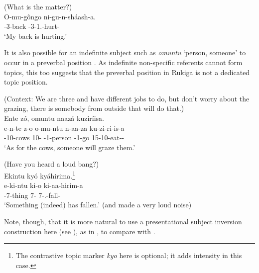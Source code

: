 \documentclass[output=paper]{langscibook}
\begin{document}
\ea
\label{bkm:Ref116291368}
(What is the matter?)\\
\gll
O-mu-gôngo  ni-gu-n-sháash-a.\\
\AUG{}-3-back  \IPFV{}-3\SM{}-1\SG{}.\OM{}-hurt-\FV{} \\
\glt
`My back is hurting.’\\


\z

It is also possible for an indefinite subject such as \textit{omuntu} ‘person, someone’ to occur in a preverbal position . As indefinite non-specific referents cannot form topics, this too suggests that the preverbal position in Rukiga is not a dedicated topic position.

\ea
\label{bkm:Ref113432268}
(Context: We are three and have different jobs to do, but don’t worry about the grazing, there   is somebody from outside that will do that.)\\
Ente zó, omuntu naazá kuziríisa.\\
\gll
e-n-te  z-o  o-mu-ntu  n-aa-za  ku-zi-ri-is-a\\
\AUG{}-10-cows  10-\CM{}  \AUG{}-{}1-person  \IPFV{}-1\SM{}-go  15-10\OM{}-eat-\CAUS{}-\FV{}\\
\glt
`As for the cows, someone will graze them.’\\


\z

\ea
\label{bkm:Ref113432286}
(Have you heard a loud bang?)\\
Ekintu kyó kyáhirima.\footnote{The contrastive topic marker \textit{kyo} here is optional; it adds intensity in this case.}\\
\gll
e-ki-ntu  ki-o  ki-aa-hirim-a\\
\AUG{}-7-thing  7-\PRO{}  7\SM{}-\N{}.\PST{}-fall-\FV{}\\
\glt
`Something (indeed) has fallen.’ (and made a very loud noise)\\


\z

Note, though, that it is more natural to use a presentational subject inversion construction here (see ), as in , to compare with .
\end{document}

